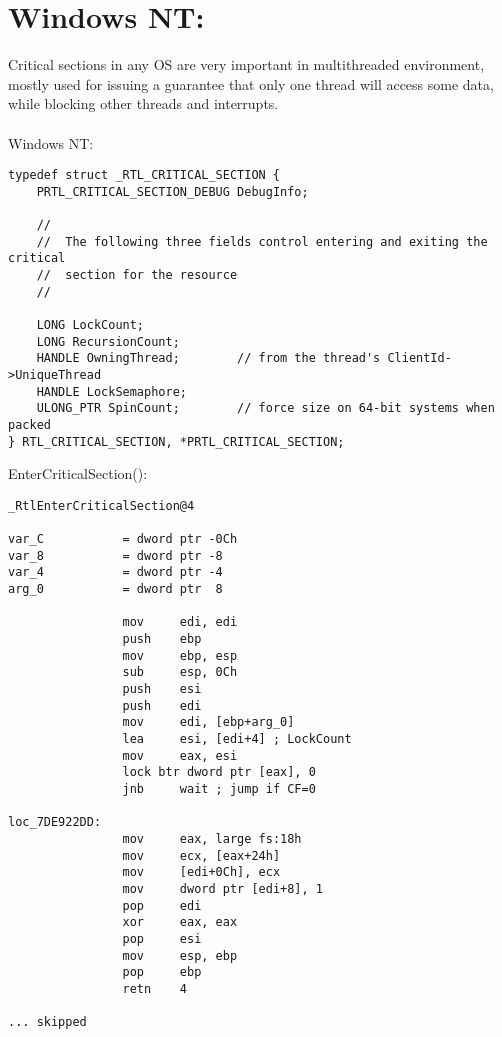 ﻿\section{Windows NT: }

\label{critical_sections}

{Critical sections in any \ac{OS} are very important in multithreaded environment,
mostly used for issuing a guarantee
that only one thread will access some data, while blocking other threads and interrupts}. \\
\\
  
 \gls{Windows NT}:

\begin{lstlisting}[caption=(Windows Research Kernel v1.2) public/sdk/inc/nturtl.h]
typedef struct _RTL_CRITICAL_SECTION {
    PRTL_CRITICAL_SECTION_DEBUG DebugInfo;

    //
    //  The following three fields control entering and exiting the critical
    //  section for the resource
    //

    LONG LockCount;
    LONG RecursionCount;
    HANDLE OwningThread;        // from the thread's ClientId->UniqueThread
    HANDLE LockSemaphore;
    ULONG_PTR SpinCount;        // force size on 64-bit systems when packed
} RTL_CRITICAL_SECTION, *PRTL_CRITICAL_SECTION;
\end{lstlisting}

 EnterCriticalSection():

\begin{lstlisting}[caption=Windows 2008/ntdll.dll/x86 (begin)]
_RtlEnterCriticalSection@4

var_C           = dword ptr -0Ch
var_8           = dword ptr -8
var_4           = dword ptr -4
arg_0           = dword ptr  8

                mov     edi, edi
                push    ebp
                mov     ebp, esp
                sub     esp, 0Ch
                push    esi
                push    edi
                mov     edi, [ebp+arg_0]
                lea     esi, [edi+4] ; LockCount
                mov     eax, esi
                lock btr dword ptr [eax], 0
                jnb     wait ; jump if CF=0

loc_7DE922DD:
                mov     eax, large fs:18h
                mov     ecx, [eax+24h]
                mov     [edi+0Ch], ecx
                mov     dword ptr [edi+8], 1
                pop     edi
                xor     eax, eax
                pop     esi
                mov     esp, ebp
                pop     ebp
                retn    4

... skipped
\end{lstlisting}

